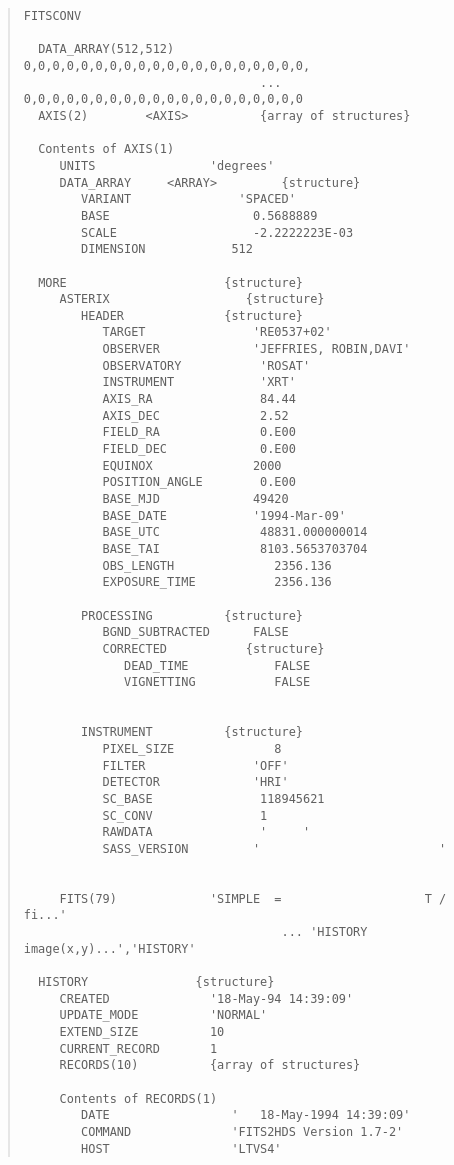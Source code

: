 \documentclass{book}
\renewcommand{\_}{{\tt\char'137}}     %
\begin{document}
\begin{quote}\begin{verbatim}
FITSCONV  
 
  DATA_ARRAY(512,512)     0,0,0,0,0,0,0,0,0,0,0,0,0,0,0,0,0,0,0,0,
                                 ... 0,0,0,0,0,0,0,0,0,0,0,0,0,0,0,0,0,0,0,0
  AXIS(2)        <AXIS>          {array of structures}
 
  Contents of AXIS(1)
     UNITS                'degrees'
     DATA_ARRAY     <ARRAY>         {structure}
        VARIANT               'SPACED'
        BASE                    0.5688889
        SCALE                   -2.2222223E-03
        DIMENSION            512
 
  MORE                      {structure}
     ASTERIX                   {structure}
        HEADER              {structure}
           TARGET               'RE0537+02'
           OBSERVER             'JEFFRIES, ROBIN,DAVI'
           OBSERVATORY           'ROSAT'
           INSTRUMENT            'XRT'
           AXIS_RA               84.44
           AXIS_DEC              2.52
           FIELD_RA              0.E00
           FIELD_DEC             0.E00
           EQUINOX              2000
           POSITION_ANGLE        0.E00
           BASE_MJD             49420
           BASE_DATE            '1994-Mar-09'
           BASE_UTC              48831.000000014
           BASE_TAI              8103.5653703704
           OBS_LENGTH              2356.136
           EXPOSURE_TIME           2356.136
 
        PROCESSING          {structure}
           BGND_SUBTRACTED      FALSE
           CORRECTED           {structure}
              DEAD_TIME            FALSE
              VIGNETTING           FALSE
 
 
        INSTRUMENT          {structure}
           PIXEL_SIZE              8
           FILTER               'OFF'
           DETECTOR             'HRI'
           SC_BASE               118945621
           SC_CONV               1
           RAWDATA               '     '
           SASS_VERSION         '                         '
 
 
     FITS(79)             'SIMPLE  =                    T / fi...'
                                    ... 'HISTORY     image(x,y)...','HISTORY'
 
  HISTORY               {structure}
     CREATED              '18-May-94 14:39:09'
     UPDATE_MODE          'NORMAL'
     EXTEND_SIZE          10
     CURRENT_RECORD       1
     RECORDS(10)          {array of structures}
 
     Contents of RECORDS(1)
        DATE                 '   18-May-1994 14:39:09'
        COMMAND              'FITS2HDS Version 1.7-2'
        HOST                 'LTVS4'
\end{verbatim}\end{quote}
\end{document}
